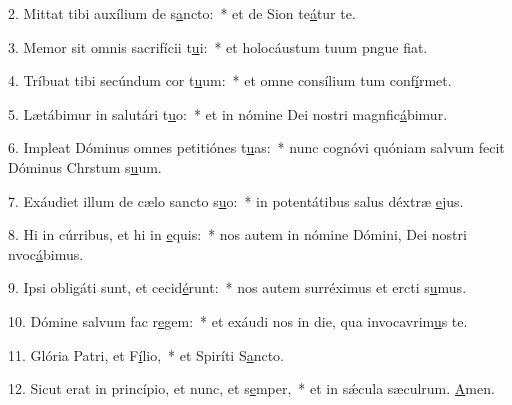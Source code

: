 2. Mittat tibi auxílium de s\uline{a}ncto:~* et de Sion te\uline{á}tur te.\par 
3. Memor sit omnis sacrifícii t\uline{u}i:~* et holocáustum tuum pngue f\uline{i}at.\par 
4. Tríbuat tibi secúndum cor t\uline{u}um:~* et omne consílium tum conf\uline{í}rmet.\par 
5. Lætábimur in salutári t\uline{u}o:~* et in nómine Dei nostri magnfic\uline{á}bimur.\par 
6. Impleat Dóminus omnes petitiónes t\uline{u}as:~* nunc cognóvi quóniam salvum fecit Dóminus Chrstum s\uline{u}um.\par 
7. Exáudiet illum de cælo sancto s\uline{u}o:~* in potentátibus salus déxtræ \uline{e}jus.\par 
8. Hi in cúrribus, et hi in \uline{e}quis:~* nos autem in nómine Dómini, Dei nostri nvoc\uline{á}bimus.\par 
9. Ipsi obligáti sunt, et cecid\uline{é}runt:~* nos autem surréximus et ercti s\uline{u}mus.\par 
10. Dómine salvum fac r\uline{e}gem:~* et exáudi nos in die, qua invocavrim\uline{u}s te.\par 
11. Glória Patri, et F\uline{í}lio,~* et Spiríti S\uline{a}ncto.\par 
12. Sicut erat in princípio, et nunc, et s\uline{e}mper,~* et in sǽcula sæculrum. \uline{A}men.\par 
